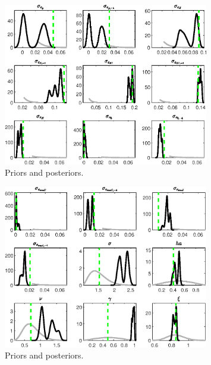  
\begin{figure}[H]
\centering
\includegraphics[width=0.80\textwidth]{BRS_sectoral_wo_gmf/Output/BRS_sectoral_wo_gmf_PriorsAndPosteriors1}
\caption{Priors and posteriors.}\label{Fig:PriorsAndPosteriors:1}
\end{figure}
 
\begin{figure}[H]
\centering
\includegraphics[width=0.80\textwidth]{BRS_sectoral_wo_gmf/Output/BRS_sectoral_wo_gmf_PriorsAndPosteriors2}
\caption{Priors and posteriors.}\label{Fig:PriorsAndPosteriors:2}
\end{figure}
 
